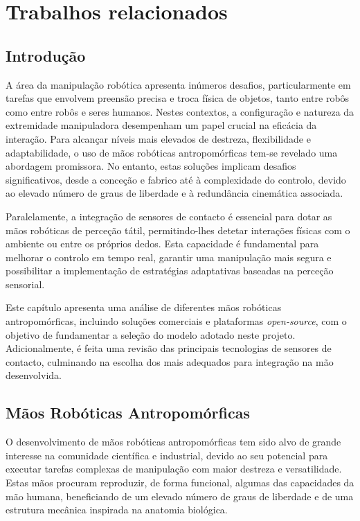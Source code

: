 \chapter{Trabalhos relacionados}
\label{chapter:mãos robóticas antropomórficas}

\section{Introdução}

A área da manipulação robótica apresenta inúmeros desafios, particularmente em tarefas que envolvem preensão precisa e troca física de objetos, tanto entre robôs como entre robôs e seres humanos. Nestes contextos, a configuração e natureza da extremidade manipuladora desempenham um papel crucial na eficácia da interação. Para alcançar níveis mais elevados de destreza, flexibilidade e adaptabilidade, o uso de mãos robóticas antropomórficas tem-se revelado uma abordagem promissora. No entanto, estas soluções implicam desafios significativos, desde a conceção e fabrico até à complexidade do controlo, devido ao elevado número de graus de liberdade e à redundância cinemática associada.

Paralelamente, a integração de sensores de contacto é essencial para dotar as mãos robóticas de perceção tátil, permitindo-lhes detetar interações físicas com o ambiente ou entre os próprios dedos. Esta capacidade é fundamental para melhorar o controlo em tempo real, garantir uma manipulação mais segura e possibilitar a implementação de estratégias adaptativas baseadas na perceção sensorial.

Este capítulo apresenta uma análise de diferentes mãos robóticas antropomórficas, incluindo soluções comerciais e plataformas \textit{open-source}, com o objetivo de fundamentar a seleção do modelo adotado neste projeto. Adicionalmente, é feita uma revisão das principais tecnologias de sensores de contacto, culminando na escolha dos mais adequados para integração na mão desenvolvida.


\section{Mãos Robóticas Antropomórficas}

O desenvolvimento de mãos robóticas antropomórficas tem sido alvo de grande interesse na comunidade científica e industrial, devido ao seu potencial para executar tarefas complexas de manipulação com maior destreza e versatilidade. Estas mãos procuram reproduzir, de forma funcional, algumas das capacidades da mão humana, beneficiando de um elevado número de graus de liberdade e de uma estrutura mecânica inspirada na anatomia biológica. 

